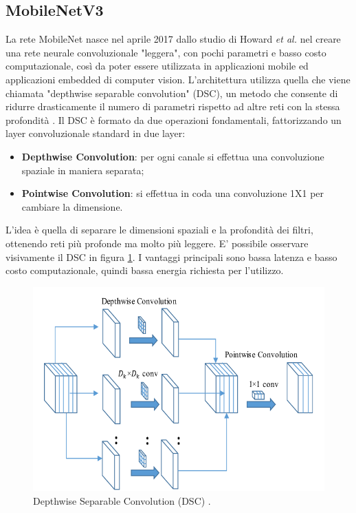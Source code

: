 \documentclass[11pt]{report}
\begin{document}
\subsection{MobileNetV3}

La rete MobileNet nasce nel aprile 2017 dallo studio di Howard \textit{et al.} \cite{mobilenet2017} nel creare una rete neurale convoluzionale "leggera", con pochi parametri e basso costo computazionale, così da poter essere utilizzata in applicazioni mobile ed applicazioni embedded di computer vision.  L'architettura utilizza quella che viene chiamata "depthwise separable convolution" (DSC), un metodo che consente di ridurre drasticamente il numero di parametri rispetto ad altre reti con la stessa profondità  \cite{pujara_2020}. Il DSC è formato da due operazioni fondamentali, fattorizzando un layer convoluzionale standard in due layer:
\begin{itemize}
    \item \textbf{Depthwise Convolution}: per ogni canale si effettua una convoluzione spaziale in maniera separata;
    \item \textbf{Pointwise Convolution}: si effettua in coda una convoluzione 1X1 per cambiare la dimensione.
\end{itemize}

L'idea è quella di separare le dimensioni spaziali e la profondità dei filtri, ottenendo reti più profonde ma molto più leggere. E' possibile osservare visivamente il DSC in figura \ref{fig:DSC}. I vantaggi principali sono bassa latenza e basso costo computazionale, quindi bassa energia richiesta per l'utilizzo.


\begin{figure}
    \centering
    \includegraphics[scale=0.45]{img/Depthwise-separable-convolution-block.png}
    \caption{Depthwise Separable Convolution (DSC) \cite{dsc}.}
    \label{fig:DSC}
\end{figure}
\end{document}

